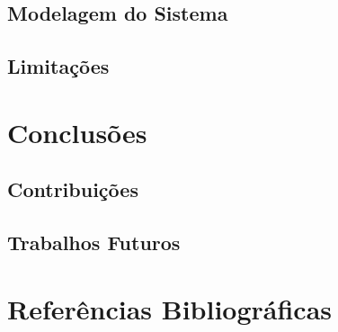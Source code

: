 \documentclass{beamer}
\begin{document}
\subsection[Modelagem do Sistema]{Modelagem do Sistema}

\subsection[Limitações]{Limitações}

\section{Conclusões}

\subsection[Contribuições]{Contribuições}

\subsection[Trabalhos Futuros]{Trabalhos Futuros}

\section{Referências Bibliográficas}

\begin{frame}[allowframebreaks]





\end{frame}
\end{document}
